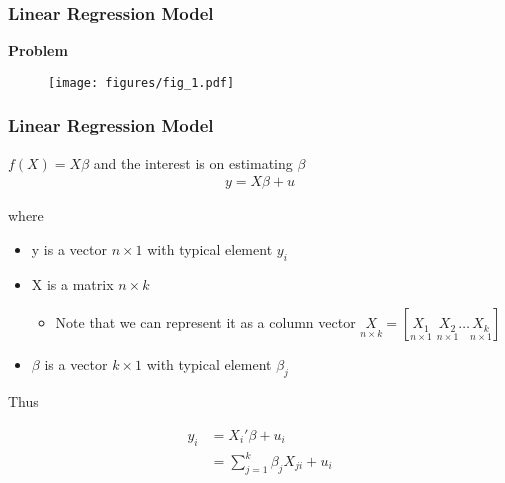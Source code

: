 \documentclass[
  shownotes,
  xcolor={svgnames},
  hyperref={colorlinks,citecolor=DarkBlue,linkcolor=DarkRed,urlcolor=DarkBlue}
  ]{beamer}
\begin{document}
\begin{frame}
\frametitle{Linear Regression Model}

{\bf Problem}


\begin{figure}[H] \centering
  \centering
  \texttt{[image: figures/fig\_1.pdf]}
  \\
  \tiny
\end{figure}


\end{frame}
\begin{frame}
\frametitle{Linear Regression Model}
\bigskip
$f(X)=X\beta$ and the interest is on estimating $\beta$
\begin{align}
y = X \beta +u
\end{align}

where 
\begin{itemize}
  \item y is a vector $n \times 1$ with typical element $y_i$
  \item X is a matrix $n \times k$ 
  \begin{itemize}
    \tiny
      \item Note that we can represent it as a column vector $\underset{n\times k}{X}=[\underset{n\times 1}{X_1}\,\,\underset{n\times 1}{X_2}\dots \underset{n\times 1}{X_k}] $
  \end{itemize}
  \item $\beta$ is a vector $k \times 1$ with typical element $\beta_j$
\end{itemize}

\bigskip
Thus 

\begin{align}
y_i &= X_i' \beta +u_i  \\ \nonumber
    &= \sum_{j=1}^k \beta_j X_{ji} +u_i
\end{align}

\end{frame}
\end{document}
